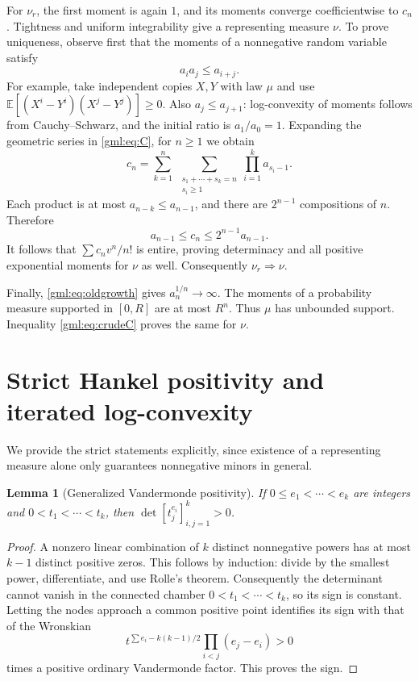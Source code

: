 \documentclass[11pt]{article}
\numberwithin{equation}{section}
\newtheorem{lemma}[theorem]{Lemma}
\theoremstyle{definition}
\theoremstyle{remark}
\newcommand{\E}{\mathbb E}
\begin{document}
For $\nu_r$, the first moment is again $1$, and its moments converge
coefficientwise to $c_n$. Tightness and uniform integrability give a
representing measure $\nu$. To prove uniqueness, observe first that the
moments of a nonnegative random variable satisfy
\begin{equation}\label{gml:eq:supermult}
 a_i a_j\le a_{i+j}.
\end{equation}
For example, take independent copies $X,Y$ with law $\mu$ and use
$\E[(X^i-Y^i)(X^j-Y^j)]\ge0$. Also $a_j\le a_{j+1}$: log-convexity
of moments follows from Cauchy--Schwarz, and the initial ratio is
$a_1/a_0=1$.
Expanding the geometric series in \eqref{gml:eq:C}, for $n\ge1$ we obtain
\begin{equation}\label{gml:eq:compositions}
 c_n=\sum_{k=1}^n\ 
 \sum_{\substack{s_1+\cdots+s_k=n\\s_i\ge1}}
       \prod_{i=1}^k a_{s_i-1}.
\end{equation}
Each product is at most $a_{n-k}\le a_{n-1}$, and there are
$2^{n-1}$ compositions of $n$. Therefore
\begin{equation}\label{gml:eq:crudeC}
 a_{n-1}\le c_n\le2^{n-1}a_{n-1}.
\end{equation}
It follows that $\sum c_nv^n/n!$ is entire, proving determinacy and all
positive exponential moments for $\nu$ as well. Consequently
$\nu_r\Rightarrow\nu$.

Finally, \eqref{gml:eq:oldgrowth} gives $a_n^{1/n}\to\infty$. The moments of
a probability measure supported in $[0,R]$ are at most $R^n$. Thus $\mu$
has unbounded support. Inequality \eqref{gml:eq:crudeC} proves the same for $\nu$.

\section{Strict Hankel positivity and iterated log-convexity}\label{gml:sec:hankel}
We provide the strict statements explicitly, since existence of a
representing measure alone only guarantees nonnegative minors in general.

\begin{lemma}[Generalized Vandermonde positivity]\label{gml:lem:vander}
If $0\le e_1<\cdots<e_k$ are integers and
$0<t_1<\cdots<t_k$, then $\det[t_j^{e_i}]_{i,j=1}^k>0$.
\end{lemma}
\begin{proof}
A nonzero linear combination of $k$ distinct nonnegative powers has at
most $k-1$ distinct positive zeros. This follows by induction: divide by
the smallest power, differentiate, and use Rolle's theorem. Consequently
the determinant cannot vanish in the connected chamber
$0<t_1<\cdots<t_k$, so its sign is constant. Letting the nodes approach
a common positive point identifies its sign with that of the Wronskian
\[
 t^{\sum e_i-k(k-1)/2}\prod_{i<j}(e_j-e_i)>0
\]
times a positive ordinary Vandermonde factor. This proves the sign.
\end{proof}
\end{document}
